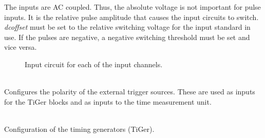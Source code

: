 		\noindent The inputs are AC coupled. Thus, the absolute voltage is not important for pulse inputs. 
		It is the relative pulse amplitude that causes the input circuits to switch. \textit{dc\tu offset} must be set to the relative switching voltage for the input standard in use. If the pulses are negative, a negative switching threshold must be set and vice versa.
	\begin{figure}
		\begin{center}
			\caption{Input circuit for each of the input channels. \label{fig:dcoffset1}}
		\end{center} 
	\end{figure}

	\\
	Configures the polarity of the external trigger sources.
	These are used as inputs for the TiGer blocks and as inputs to the time measurement unit.\par

	\\
	Configuration of the timing generators (TiGer).

